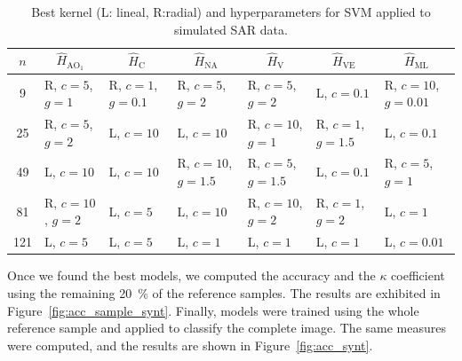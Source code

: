 \documentclass[journal]{IEEEtran}
\begin{document}

\begin{table}[htbp]
	\centering
	\caption{Best kernel (L: lineal, R:radial) and hyperparameters for SVM applied to simulated SAR data.}
	\label{tab:hyperparameters}
	\begin{tabular}{cllllll}
		\toprule
		$n$ & \multicolumn{1}{c}{$\widehat{H}_{\text{AO}_1}$} & \multicolumn{1}{c}{$\widehat{H}_\text{C}$} & \multicolumn{1}{c}{$\widehat{H}_{\text{NA}}$} & \multicolumn{1}{c}{$\widehat{H}_\text{V}$} & \multicolumn{1}{c}{$\widehat{H}_{\text{VE}}$} & \multicolumn{1}{c}{$\widehat{H}_{\text{ML}}$} \\
		\midrule
		9     & R, $c=5$, $g=1$ & R, $c=1$, $g=0.1$ & R, $c=5$, $g=2$ & R, $c=5$, $g=2$ & L, $c=0.1$ & R, $c=10$, $g=0.01$ \\
		25    & R, $c=5$, $g=2$ & L, $c=10$ & L, $c=10$ & R, $c=10$, $g=1$ & R, $c=1$, $g=1.5$ & L, $c=0.1$ \\
		49    & L, $c=10$ & L, $c=10$ & R, $c=10$, $g=1.5$ & R, $c=5$, $g=1.5$ & L, $c=0.1$ & R, $c=5$, $g=1$ \\
		81    & R, $c=10$, $g=2$ & L, $c=5$ & L, $c=10$ & R, $c=10$, $g=2$ & R, $c=1$, $g=2$ & L, $c=1$ \\
		121   & L, $c=5$ & L, $c=5$ & L, $c=1$ & L, $c=1$ & L, $c=1$ & L, $c=0.01$ \\
		\bottomrule
	\end{tabular}
\end{table}

Once we found the best models, we computed the accuracy and the $\kappa$ coefficient using the remaining \SI{20}{\percent} of the reference samples. The results are exhibited in Figure~\ref{fig:acc_sample_synt}.
Finally, models were trained using the whole reference sample and applied to classify the complete image. 
The same measures were computed, and the results are shown in Figure~\ref{fig:acc_synt}.
\end{document}

